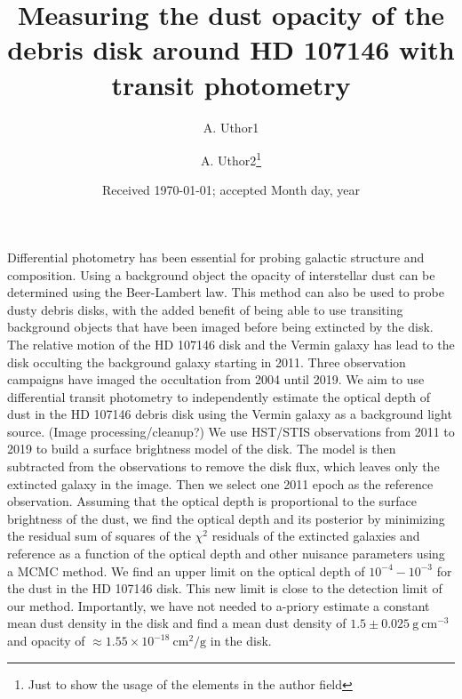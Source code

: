 \documentclass{aa}
\begin{document}
 


   \title{Measuring the dust opacity of the debris disk around HD 107146 with transit photometry}


   \author{A. Uthor1
          \and
          A. Uthor2\fnmsep\thanks{Just to show the usage
          of the elements in the author field}
          }


   \date{Received \today; accepted Month day, year}

 
  \abstract
   {Differential photometry has been essential for probing galactic structure and composition. Using a background object the opacity of interstellar dust can be determined using the Beer-Lambert law. This method can also be used to probe dusty debris disks, with the added benefit of being able to use transiting background objects that have been imaged before being extincted by the disk. The relative motion of the HD 107146 disk and the Vermin galaxy has lead to the disk occulting the background galaxy starting in 2011. Three observation campaigns have imaged the occultation from 2004 until 2019.}
   {We aim to use differential transit photometry to independently estimate the optical depth of dust in the HD 107146 debris disk using the Vermin galaxy as a background light source. }
   {(Image processing/cleanup?) We use HST/STIS observations from 2011 to 2019 to build a surface brightness model of the disk. The model is then subtracted from the observations to remove the disk flux, which leaves only the extincted galaxy in the image. Then we select one 2011 epoch as the reference observation. Assuming that the optical depth is proportional to the surface brightness of the dust, we find the optical depth and its posterior by minimizing the residual sum of squares of the $\chi^2$ residuals of the extincted galaxies and reference as a function of the optical depth and other nuisance parameters using a MCMC method.}
   {We find an upper limit on the optical depth of $10^{-4}-10^{-3}$ for the dust in the HD 107146 disk. This new limit is close to the detection limit of our method. Importantly, we have not needed to a-priory estimate a constant mean dust density in the disk and find a mean dust density of $1.5 \pm 0.025 \mathrm{~g} \mathrm{~cm}^{-3}$ and opacity of $\approx 1.55 \times 10^{-18} \mathrm{~cm}^{2} / \mathrm{g} $ in the disk.}
   {}
\end{document}
